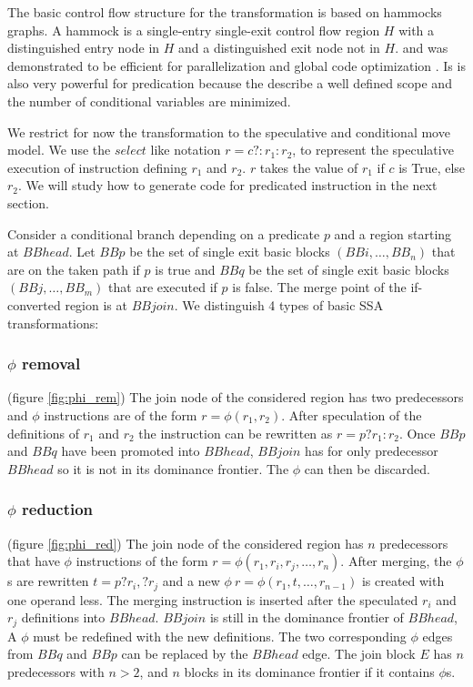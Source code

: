 The basic control flow structure for the transformation is based on hammocks graphs. A hammock is a single-entry single-exit control flow region $H$ with a distinguished entry node in $H$ and a distinguished exit node not in $H$. \cite{Ferrante:1987:PDG:24039.24041} and was demonstrated to be efficient for parallelization and global code optimization \cite{Zhang:2004:UHG:977250.977393}. Is is also very powerful for predication because the describe a well defined scope and the number of conditional variables are minimized.

We restrict for now the transformation to the speculative and conditional move model. We use the $select$ like notation $r=c?:r_1:r_2$, to represent the speculative execution of instruction defining $r_1$ and $r_2$. $r$ takes the value of $r_1$ if $c$ is True, else $r_2$. We will study how to generate code for predicated instruction in the next section.

Consider a conditional branch depending on a predicate $p$ and a region starting at $BBhead$. Let $BBp$ be the set of single exit basic blocks $(BBi,\dots,BB_n)$ that are on the taken path if $p$ is true and $BBq$ be the set of single exit basic blocks $(BBj,\dots,BB_m)$ that are executed if $p$ is false. The merge point of the if-converted region is at $BBjoin$. We distinguish 4 types of basic SSA transformations:

\subsubsection{$\phi$ removal} (figure \ref{fig:phi_rem})
The join node of the considered region has two predecessors and $\phi$ instructions are of the form $r=\phi(r_1,r_2)$. After speculation of the definitions of $r_1$ and $r_2$ the instruction can be rewritten as $r=p?r_1:r_2$.
Once $BBp$ and $BBq$ have been promoted into $BBhead$, $BBjoin$ has for only predecessor $BBhead$ so it is not in its dominance frontier. The $\phi$ can then be discarded.

\subsubsection{$\phi$ reduction} (figure \ref{fig:phi_red})
 The join node of the considered region has $n$ predecessors that have $\phi$ instructions of the form $r=\phi(r_1,r_i,r_j,\dots,r_n)$. After merging, the $\phi$s are rewritten $t=p?r_i,?r_j$ and a new $\phi\:r=\phi(r_1,t,\dots,r_{n-1})$ is created with one operand less. The merging instruction is inserted after the speculated $r_i$ and $r_j$ definitions into $BBhead$.
$BBjoin$ is still in the dominance frontier of $BBhead$, A $\phi$ must be redefined with the new definitions. The two corresponding $\phi$ edges from $BBq$ and $BBp$ can be replaced by the $BBhead$ edge.
The join block $E$ has $n$ predecessors with $n > 2$, and $n$ blocks in its dominance frontier if it contains $\phi$s.

